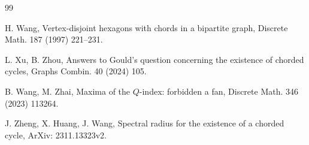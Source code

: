 \documentclass[12pt]{article}
\begin{document}
\begin{thebibliography}{99}





%
 H. Wang, Vertex-disjoint hexagons with chords in a bipartite graph,
Discrete Math. 187 (1997) 221--231.
%

 L. Xu, B. Zhou,
Answers to Gould's question concerning the existence of chorded cycles,
Graphs Combin. 40 (2024) 105.



 B. Wang, M. Zhai,
Maxima of the $Q$-index: forbidden a fan,
Discrete Math. 346 (2023) 113264.




 J. Zheng, X. Huang, J. Wang,
Spectral radius for the existence of a chorded cycle, ArXiv: 2311.13323v2.


%


\end{thebibliography}
\end{document}
